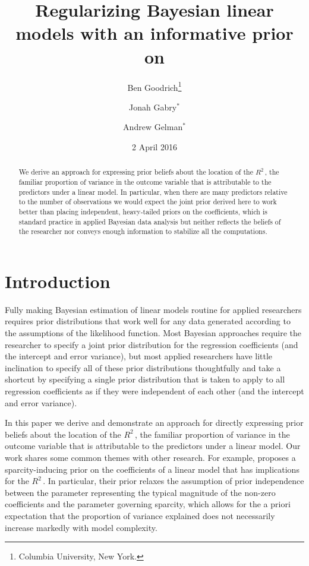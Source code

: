 \documentclass[11pt]{article}
\title{\bf Regularizing Bayesian linear models with an informative prior on \Rsq
    \vspace{.1in}}
\author{Ben Goodrich\footnote{Columbia University, New York.}
    \and Jonah Gabry$^\ast$
    \and Andrew Gelman$^\ast$
    \vspace{.1in}}
\date{2 April 2016
    \vspace{-.2in}}
\newcommand{\Rsq}{$R^2\,$}
\begin{document}
\maketitle
\thispagestyle{empty}

\begin{abstract}
\noindent We derive an approach for expressing prior beliefs about the location
of the \Rsq, the familiar proportion of variance in the outcome variable that is
attributable to the predictors under a linear model. In particular, when there
are many predictors relative to the number of observations we would expect the
joint prior derived here to work better than placing independent, heavy-tailed
priors on the coefficients, which is  standard practice in applied Bayesian data
analysis but neither reflects the beliefs of the researcher nor conveys enough
information to stabilize all the computations.
\end{abstract}


\section{Introduction}

Fully making Bayesian estimation of linear models routine for applied
researchers requires prior distributions that work well for any data generated
according to the assumptions of the likelihood function. Most Bayesian
approaches require the researcher to specify a joint prior distribution for the
regression coefficients (and the intercept and error variance), but most applied
researchers have little inclination to specify all of these prior distributions
thoughtfully and take a shortcut by specifying a single prior distribution that
is taken to apply to all regression coefficients as if they were independent of
each other (and the intercept and error variance).

In this paper we derive and demonstrate an approach for directly expressing
prior beliefs about the location of the \Rsq, the familiar proportion of
variance in the outcome variable that is attributable to the predictors under a
linear model. Our work shares some common themes with other research. For
example,  proposes a sparcity-inducing prior on the
coefficients of a linear model that has implications for the \Rsq. In
particular, their prior relaxes the assumption of prior independence between the
parameter representing the typical magnitude of the non-zero coefficients and
the parameter governing sparcity, which allows for the a priori expectation that
the proportion of variance explained does not necessarily increase markedly with
model complexity.
\end{document}
